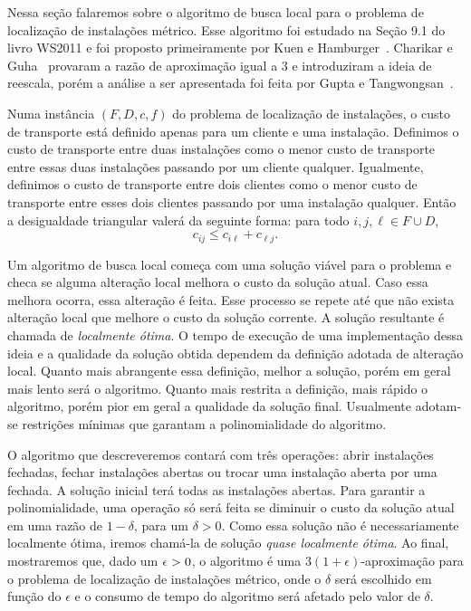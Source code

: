 Nessa seção falaremos sobre o algoritmo de busca local para o problema de localização de instalações métrico. Esse algoritmo foi estudado na Seção 9.1 do livro WS2011 e foi proposto primeiramente por Kuen e Hamburger~\cite{KH}. Charikar e Guha~\cite{Charikar&Guha'05} provaram a razão de aproximação igual a 3 e introduziram a ideia de reescala, porém a análise a ser apresentada foi feita por Gupta e Tangwongsan~\cite{DBLP:journals/corr/abs-0809-2554}.

Numa instância $(F,D,c,f)$ do problema de localização de instalações, o custo de transporte está definido apenas para um cliente e uma instalação.
Definimos o custo de transporte entre duas instalações como o menor custo de transporte entre essas duas instalações passando por um cliente qualquer. Igualmente, definimos o custo de transporte entre dois clientes como o menor custo de transporte entre esses dois clientes passando por uma instalação qualquer. Então a desigualdade triangular valerá da seguinte forma: para todo $i,j,\ell \in F \cup D$, 
\[ c_{ij} \leq c_{i\ell} + c_{\ell j}.\]

Um algoritmo de busca local começa com uma solução viável para o problema e checa se alguma alteração local melhora o custo da solução atual. Caso essa melhora ocorra, essa alteração é feita. Esse processo se repete até que não exista alteração local que melhore o custo da solução corrente. A solução resultante é chamada de \emph{localmente ótima}. O tempo de execução de uma implementação dessa ideia e a qualidade da solução obtida dependem da definição adotada de alteração local. Quanto mais abrangente essa definição, melhor a solução, porém em geral mais lento será o algoritmo. Quanto mais restrita a definição, mais rápido o algoritmo, porém pior em geral a qualidade da solução final. Usualmente adotam-se restrições mínimas que garantam a polinomialidade do algoritmo.

O algoritmo que descreveremos contará com três operações: abrir instalações fechadas, fechar instalações abertas ou trocar uma instalação aberta por uma fechada. A solução inicial terá todas as instalações abertas. Para garantir a polinomialidade, uma operação só será feita se diminuir o custo da solução atual em uma razão de $1-\delta$, para um $\delta>0$. Como essa solução não é necessariamente localmente ótima, iremos chamá-la de solução \emph{quase localmente ótima}. Ao final, mostraremos que, dado um $\epsilon > 0$, o algoritmo é uma $3(1 + \epsilon)$-aproximação para o problema de localização de instalações métrico, onde o $\delta$ será escolhido em função do $\epsilon$ e o consumo de tempo do algoritmo será afetado pelo valor de $\delta$.

